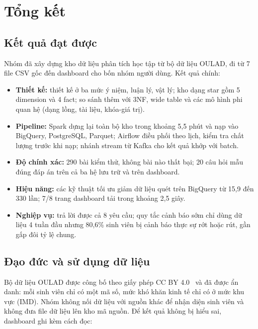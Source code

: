 \section{Tổng kết}
\label{sec:tong-ket}

\subsection{Kết quả đạt được}

Nhóm đã xây dựng kho dữ liệu phân tích học tập từ bộ dữ liệu OULAD, đi từ 7 file CSV gốc đến
dashboard cho bốn nhóm người dùng. Kết quả chính:

\begin{itemize}
  \item \textbf{Thiết kế:} thiết kế ở ba mức ý niệm, luận lý, vật lý; kho dạng star gồm 5 dimension
        và 4 fact; so sánh thêm với 3NF, wide table và các mô hình phi quan hệ (dạng lồng, tài liệu,
        khóa-giá trị).
  \item \textbf{Pipeline:} Spark dựng lại toàn bộ kho trong khoảng 5,5 phút và nạp vào BigQuery,
        PostgreSQL, Parquet; Airflow điều phối theo lịch, kiểm tra chất lượng trước khi nạp; nhánh
        stream từ Kafka cho kết quả khớp với batch.
  \item \textbf{Độ chính xác:} 290 bài kiểm thử, không bài nào thất bại; 20 câu hỏi mẫu đúng đáp án
        trên cả ba hệ lưu trữ và trên dashboard.
  \item \textbf{Hiệu năng:} các kỹ thuật tối ưu giảm dữ liệu quét trên BigQuery từ 15,9 đến 330 lần;
        7/8 trang dashboard tải trong khoảng 2,5 giây.
  \item \textbf{Nghiệp vụ:} trả lời được cả 8 yêu cầu; quy tắc cảnh báo sớm chỉ dùng dữ liệu 4 tuần
        đầu nhưng 80,6\% sinh viên bị cảnh báo thực sự rớt hoặc rút, gần gấp đôi tỷ lệ chung.
\end{itemize}

\subsection{Đạo đức và sử dụng dữ liệu}
\label{sec:dao-duc}

Bộ dữ liệu OULAD được công bố theo giấy phép CC BY 4.0~\cite{kuzilek2017oulad,oulad_dataset} và đã
được ẩn danh: mỗi sinh viên chỉ có một mã số, mức khó khăn kinh tế chỉ có ở mức khu vực (IMD).
Nhóm không nối dữ liệu với nguồn khác để nhận diện sinh viên và không đưa file dữ liệu lên kho mã
nguồn. Để kết quả không bị hiểu sai, dashboard ghi kèm cách đọc:


